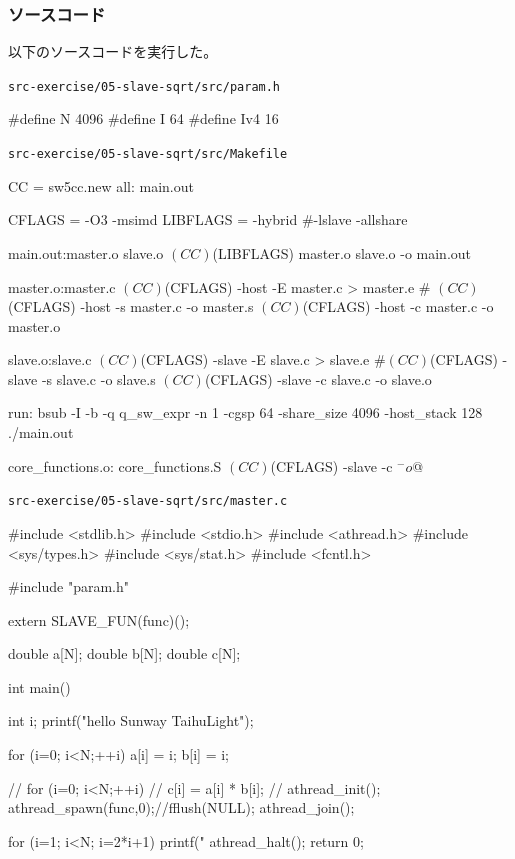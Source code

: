 \subsubsection{ソースコード}
以下のソースコードを実行した。

\verb`src-exercise/05-slave-sqrt/src/param.h`
\begin{code}
#define N 4096
#define I 64
#define Iv4 16

\end{code}

\verb`src-exercise/05-slave-sqrt/src/Makefile`
\begin{code}
CC = sw5cc.new
all: main.out

CFLAGS = -O3 -msimd
LIBFLAGS = -hybrid #-lslave -allshare

main.out:master.o slave.o
	$(CC) $(LIBFLAGS) master.o slave.o -o main.out

master.o:master.c
	$(CC) $(CFLAGS) -host -E master.c > master.e
	#	$(CC) $(CFLAGS) -host -s master.c -o master.s
	$(CC) $(CFLAGS) -host -c master.c -o master.o

slave.o:slave.c
	$(CC) $(CFLAGS) -slave -E slave.c > slave.e
	#$(CC) $(CFLAGS) -slave -s slave.c -o slave.s
	$(CC) $(CFLAGS) -slave -c slave.c -o slave.o

run:
	bsub -I -b -q q_sw_expr -n 1 -cgsp 64 -share_size 4096 -host_stack 128 ./main.out

core_functions.o: core_functions.S
	$(CC) $(CFLAGS) -slave -c $^ -o $@

\end{code}

\verb`src-exercise/05-slave-sqrt/src/master.c`
\begin{code}
#include <stdlib.h>
#include <stdio.h>
#include <athread.h>
#include <sys/types.h>
#include <sys/stat.h>
#include <fcntl.h>

#include "param.h"

extern SLAVE_FUN(func)();

double a[N];
double b[N];
double c[N];

int main() {
  int i;
  printf("hello Sunway TaihuLight\n");

  for (i=0; i<N;++i){
    a[i] = i;
    b[i] = i;
  }

  // for (i=0; i<N;++i){
  //   c[i] = a[i] * b[i];
  // }
  athread_init();
  athread_spawn(func,0);//fflush(NULL);
  athread_join();

  for (i=1; i<N; i=2*i+1){
    printf("%
  }
  athread_halt();
  return 0;
}

\end{code}

